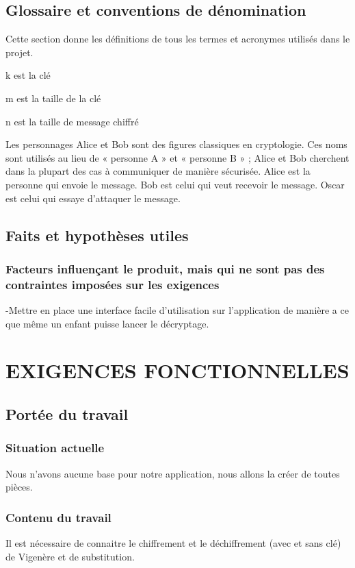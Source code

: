 \documentclass[a4]{article}
\begin{document}
		\subsection{Glossaire et conventions de dénomination}
			Cette section donne les définitions de tous les termes et acronymes utilisés dans le projet.

			k est la clé

			m est la taille de la clé

			n est la taille de message chiffré
			
			Les personnages Alice et Bob sont des figures classiques en cryptologie. Ces noms sont utilisés au lieu de « personne A » et « personne B » ; Alice et Bob cherchent dans la plupart des cas à communiquer de manière sécurisée.
			Alice est la personne qui envoie le message.
			Bob est celui qui veut recevoir le message.
			Oscar est celui qui essaye d'attaquer le message.
		\subsection{Faits et hypothèses utiles}	
			\subsubsection{Facteurs influençant le produit, mais qui ne sont pas des contraintes imposées sur les exigences}
	
				-Mettre en place une interface facile d'utilisation sur l'application de manière a ce que même 					un enfant puisse lancer le décryptage.
	\section{EXIGENCES FONCTIONNELLES}
		\subsection{Portée du travail}
			\subsubsection{Situation actuelle}
				Nous n'avons aucune base pour notre application, nous allons la créer de toutes pièces.
			\subsubsection{Contenu du travail}
				Il est nécessaire de connaitre le chiffrement et le déchiffrement (avec et sans clé) de 				Vigenère et de substitution.
\end{document}
